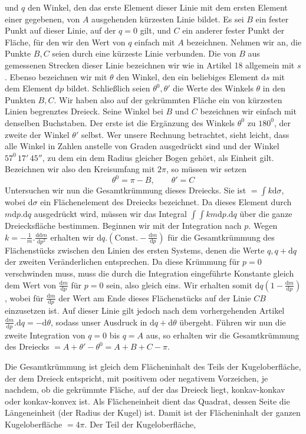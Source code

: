 %
und \(q\) den Winkel, den das erste Element dieser Linie mit dem ersten Element einer gegebenen, von \(A\) ausgehenden kürzesten Linie bildet. Es sei \(B\) ein fester Punkt auf dieser Linie, auf der \(q=0\) gilt, und \(C\) ein anderer fester Punkt der Fläche, für den wir den Wert von \(q\) einfach mit \(A\) bezeichnen. Nehmen wir an, die Punkte \(B,C\) seien durch eine kürzeste Linie verbunden. Die von \(B\) aus gemessenen Strecken dieser Linie bezeichnen wir wie in Artikel 18 allgemein mit \(s\). Ebenso bezeichnen wir mit \(\theta\) den Winkel, den ein beliebiges Element \(\mathrm{d}s\) mit dem Element \(\mathrm{d}p\) bildet. Schließlich seien \(\theta^0,\theta'\) die Werte des Winkels \(\theta\) in den Punkten \(B,C\). Wir haben also auf der gekrümmten Fläche ein von kürzesten Linien begrenztes Dreieck. Seine Winkel bei \(B\) und \(C\) bezeichnen wir einfach mit denselben Buchstaben. Der erste ist die Ergänzung des Winkels \(\theta^0\) zu \(180^0\), der zweite der Winkel \(\theta'\) selbst. Wer unsere Rechnung betrachtet, sieht leicht, dass alle Winkel in Zahlen anstelle von Graden ausgedrückt sind und der Winkel \(57^0\,17'\,45''\), zu dem ein dem Radius gleicher Bogen gehört, als Einheit gilt. Bezeichnen wir also den Kreisumfang mit \(2\pi\), so müssen wir setzen
\[
\theta^0=\pi-B,\qquad\theta'=C
\]
Untersuchen wir nun die Gesamtkrümmung dieses Dreiecks. Sie ist \(=\int k\mathrm{d}\sigma\), wobei \(\mathrm{d}\sigma\) ein Flächenelement des Dreiecks bezeichnet. Da dieses Element durch \(m\mathrm{d}p\mathord{.}\mathrm{d}q\) ausgedrückt wird, müssen wir das Integral \(\int\!\int km\mathrm{d}p\mathord{.}\mathrm{d}q\) über die ganze Dreiecksfläche bestimmen. Beginnen wir mit der Integration nach \(p\). Wegen \(k=-\frac{1}{m}\mathord{.}\frac{\mathrm{d}\mathrm{d}m}{\mathrm{d}p^2}\) erhalten wir \(\mathrm{d}q\mathord{.}(\mathrm{Const.}-\frac{\mathrm{d}m}{\mathrm{d}p})\) für die Gesamtkrümmung des Flächenstücks zwischen den Linien des ersten Systems, denen die Werte \(q,q+\mathrm{d}q\) der zweiten Veränderlichen entsprechen. Da diese Krümmung für \mbox{\(p=0\)} verschwinden muss, muss die durch die Integration eingeführte Konstante gleich dem Wert von \(\frac{\mathrm{d}m}{\mathrm{d}p}\) für \(p=0\) sein, also gleich eins. Wir erhalten somit \(\mathrm{d}q(1-\frac{\mathrm{d}m}{\mathrm{d}p})\), wobei für \(\frac{\mathrm{d}m}{\mathrm{d}p}\) der Wert am Ende dieses Flächenstücks auf der Linie \(CB\) einzusetzen ist. Auf dieser Linie gilt jedoch nach dem vorhergehenden Artikel \(\frac{\mathrm{d}m}{\mathrm{d}p}\mathord{.}\mathrm{d}q=-\mathrm{d}\theta\), sodass unser Ausdruck in \(\mathrm{d}q+\mathrm{d}\theta\) übergeht. Führen wir nun die zweite Integration von \(q=0\) bis \(q=A\) aus, so erhalten wir die Gesamtkrümmung des Dreiecks \(=A+\theta'-\theta^0=A+B+C-\pi\).

Die Gesamtkrümmung ist gleich dem Flächeninhalt des Teils der Kugeloberfläche, der dem Dreieck entspricht, mit positivem oder negativem Vorzeichen, je nachdem, ob die gekrümmte Fläche, auf der das Dreieck liegt, konkav-konkav oder konkav-konvex ist. Als Flächeneinheit dient das Quadrat, dessen Seite die Längeneinheit (der Radius der Kugel) ist. Damit ist der Flächeninhalt der ganzen Kugeloberfläche \(=4\pi\). Der Teil der Kugeloberfläche,
